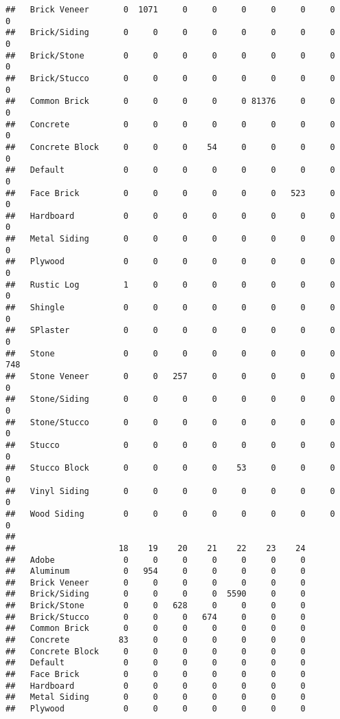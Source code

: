 \documentclass[]{article}
\begin{document}
\begin{verbatim}
##   Brick Veneer       0  1071     0     0     0     0     0     0     0
##   Brick/Siding       0     0     0     0     0     0     0     0     0
##   Brick/Stone        0     0     0     0     0     0     0     0     0
##   Brick/Stucco       0     0     0     0     0     0     0     0     0
##   Common Brick       0     0     0     0     0 81376     0     0     0
##   Concrete           0     0     0     0     0     0     0     0     0
##   Concrete Block     0     0     0    54     0     0     0     0     0
##   Default            0     0     0     0     0     0     0     0     0
##   Face Brick         0     0     0     0     0     0   523     0     0
##   Hardboard          0     0     0     0     0     0     0     0     0
##   Metal Siding       0     0     0     0     0     0     0     0     0
##   Plywood            0     0     0     0     0     0     0     0     0
##   Rustic Log         1     0     0     0     0     0     0     0     0
##   Shingle            0     0     0     0     0     0     0     0     0
##   SPlaster           0     0     0     0     0     0     0     0     0
##   Stone              0     0     0     0     0     0     0     0   748
##   Stone Veneer       0     0   257     0     0     0     0     0     0
##   Stone/Siding       0     0     0     0     0     0     0     0     0
##   Stone/Stucco       0     0     0     0     0     0     0     0     0
##   Stucco             0     0     0     0     0     0     0     0     0
##   Stucco Block       0     0     0     0    53     0     0     0     0
##   Vinyl Siding       0     0     0     0     0     0     0     0     0
##   Wood Siding        0     0     0     0     0     0     0     0     0
##                 
##                     18    19    20    21    22    23    24
##   Adobe              0     0     0     0     0     0     0
##   Aluminum           0   954     0     0     0     0     0
##   Brick Veneer       0     0     0     0     0     0     0
##   Brick/Siding       0     0     0     0  5590     0     0
##   Brick/Stone        0     0   628     0     0     0     0
##   Brick/Stucco       0     0     0   674     0     0     0
##   Common Brick       0     0     0     0     0     0     0
##   Concrete          83     0     0     0     0     0     0
##   Concrete Block     0     0     0     0     0     0     0
##   Default            0     0     0     0     0     0     0
##   Face Brick         0     0     0     0     0     0     0
##   Hardboard          0     0     0     0     0     0     0
##   Metal Siding       0     0     0     0     0     0     0
##   Plywood            0     0     0     0     0     0     0

\end{verbatim}
\end{document}
